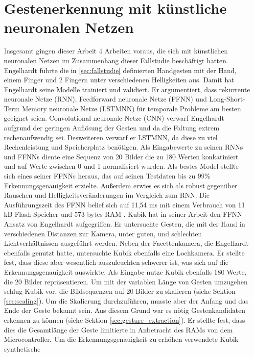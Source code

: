 \section{Gestenerkennung mit künstliche neuronalen Netzen}
Insgesamt gingen dieser Arbeit 4 Arbeiten voraus, die sich mit künstlichen neuronalen Netzen im Zusammenhang dieser Fallstudie beschäftigt hatten.
\newline
\newline
Engelhardt führte die in \ref{sec:fallstudie} definierten Handgesten mit der Hand, einem Finger und 2 Fingern unter verschiedenen Helligkeiten aus. Damit hat Engelhardt seine Modelle trainiert und validiert. Er
argumentiert, dass rekurrente neuronale Netze (RNN), Feedforward neuronale Netze (FFNN) und Long-Short-Term Memory neuronale Netze (LSTMNN) für temporale Probleme am besten geeignet seien. Convolutional neuronale
Netze (CNN) verwarf Engelhardt aufgrund der geringen Auflösung der Gesten und da die Faltung extrem rechenaufwendig sei. Desweiteren verwarf er LSTMNN, da diese zu viel Rechenleistung und Speicherplatz
benötigen. Als Eingabewerte zu seinen RNNs und FFNNs diente eine Sequenz von 20 Bilder die zu 180 Werten konkatiniert und auf Werte zwischen 0 und 1 normalisiert wurden. Als bestes Model stellte sich eines
seiner FFNNs heraus, das auf seinen Testdaten bis zu 99\% Erkennungsgenauigkeit erzielte. Außerdem erwies es sich als robust gegenüber Rauschen und Helligkeitsveränderungen im Vergleich zum RNN. Die Ausführungszeit
des FFNN belief sich auf 11,54 ms mit einem Verbrauch von 11 kB Flash-Speicher und 573 bytes RAM \cite{engelhardtThesis}.
\newline
\newline
Kubik hat in seiner Arbeit den FFNN Ansatz von Engelhardt aufgegriffen. Er untersuchte Gesten, die mit der Hand in verschiedenen Distanzen zur Kamera, unter guten, und schlechten Lichtverhältnissen ausgeführt werden.
Neben der Facettenkamera, die Engelhardt ebenfalls genutzt hatte, untersuchte Kubik ebenfalls eine Lochkamera. Er stellte fest, dass diese aber wesentlich auszuleuchten schwerer ist, was sich auf die
Erkennungsgenauigkeit auswirkte. Als Eingabe nutze Kubik ebenfalls 180 Werte, die 20 Bilder repräsentieren. Um mit der variablen Länge von Gesten umzugehen schlug Kubik vor, die Bildsequenzen auf 20 Bilder zu
skalieren (siehe Sektion \ref{sec:scaling}). Um die Skalierung durchzuführen, musste aber der Anfang und das Ende der Geste bekannt sein. Aus diesem Grund war es nötig Gestenkandidaten erkennen zu können (siehe
Sektion \ref{sec:gesture_extraction}). Er stellte fest, dass dies die Gesamtlänge der Geste limitierte in Anbetracht des RAMs von dem Microcontroller. Um die Erkennungsgenauigkeit zu erhöhen verwendete Kubik synthetische
